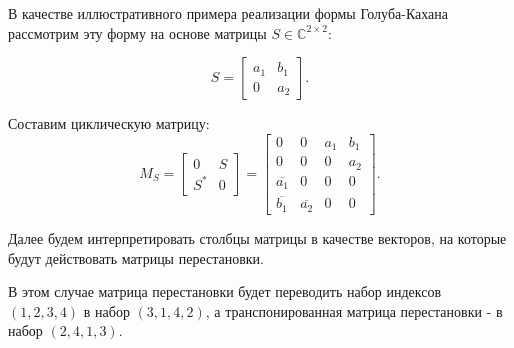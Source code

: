 \begin{example}
    В качестве иллюстративного примера реализации формы Голуба-Кахана рассмотрим эту форму на основе матрицы \(S\in \mathbb{C}^{2\times2}\):

\[
    S=\begin{bmatrix} a_1 & b_1 \\ 0 & a_2 \end{bmatrix}.
\]

Составим циклическую матрицу:
\[
    M_S=\begin{bmatrix}
        0 & S \\
        S^* & 0
    \end{bmatrix}=\begin{bmatrix} 0 & 0& a_1 & b_1 \\ 0 & 0 & 0 & a_2 \\ \overline{a_1} & 0 & 0 & 0 \\ \overline{b_1} & \overline{a_2} & 0 & 0  \end{bmatrix}.
\]

Далее будем интерпретировать столбцы матрицы в качестве векторов, на которые будут действовать матрицы перестановки.

\begin{note}
    В этом случае матрица перестановки будет переводить набор индексов \((1,2,3,4)\) в набор \((3,1,4,2)\), а транспонированная матрица перестановки - в набор \((2,4,1,3)\).
\end{note}


\end{example}
